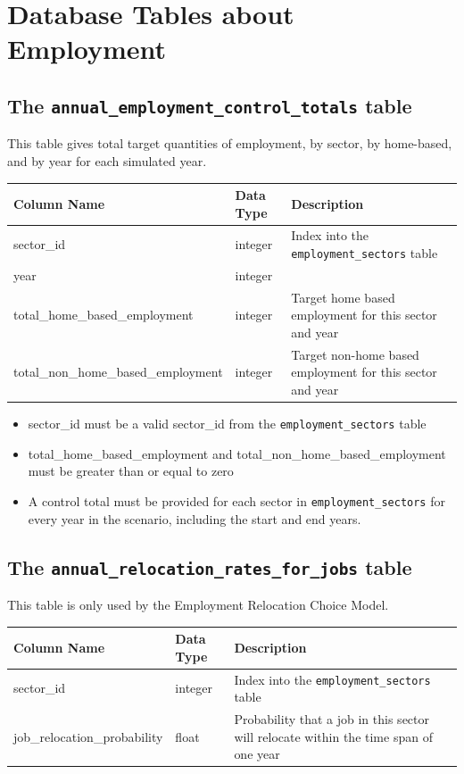 \section{Database Tables about Employment}
\label{sec:employment-tables}

\subsection{The {\tt annual_employment_control_totals} table}

This table gives total target quantities of employment, by sector, by
home-based, and by year for each simulated year.

\begin{tabular}{|l|l|l|}
\hline
\textbf{Column Name} & \textbf{Data Type} & \textbf{Description} \\

\hline
sector_id & integer & Index into the \verb|employment_sectors| table  \\
\hline
year & integer & \\
\hline
total_home_based_employment & integer &
Target home based employment for this sector and year \\
\hline
total_non_home_based_employment & integer &
Target non-home based employment for this sector and year   \\
\hline
\end{tabular}

\begin{itemize}
\tight
\item sector_id must be a valid sector_id from the \verb|employment_sectors|
table
\item total_home_based_employment and total_non_home_based_employment must be
greater than or equal to zero
\item A control total must be provided for each sector in \verb|employment_sectors| for every year in the scenario, including the start and end
years.
\end{itemize}

\subsection{The {\tt annual_relocation_rates_for_jobs} table}

This table is only used by the Employment Relocation Choice Model. 

\begin{tabular}{|l|l|p{4in}|}
\hline
\textbf{Column Name} & \textbf{Data Type} & \textbf{Description} \\
\hline
sector_id & integer &  Index into the \verb|employment_sectors| table   \\
\hline
job_relocation_probability & float & Probability that a job in this sector will relocate within the time span of one year  \\
\hline
\end{tabular}

